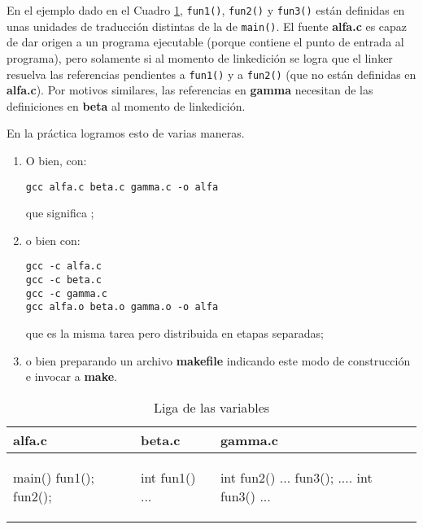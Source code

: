 \begin{ejemplo}
En el ejemplo dado en el Cuadro \ref{tab:ejliga}, \texttt{fun1()}, \texttt{fun2()} y \texttt{fun3()} están definidas en unas unidades de traducción distintas de la de \texttt{main()}. El fuente \textbf{alfa.c} es capaz de dar origen a un programa ejecutable (porque contiene el punto de entrada al programa), pero solamente si al momento de linkedición se logra que el linker resuelva las
referencias pendientes a \texttt{fun1()} y a \texttt{fun2()} (que no están definidas en \textbf{alfa.c}). Por motivos similares,
las referencias en \textbf{gamma} necesitan de las definiciones en \textbf{beta} al momento de linkedición.

En la práctica logramos esto de varias maneras.
\begin{enumerate}
	\item O bien, con:
\begin{lstlisting}
gcc alfa.c beta.c gamma.c -o alfa
\end{lstlisting}

que significa ; 
\item o bien con:

\begin{lstlisting}
gcc -c alfa.c
gcc -c beta.c
gcc -c gamma.c
gcc alfa.o beta.o gamma.o -o alfa
\end{lstlisting}

que es la misma tarea pero distribuida en etapas separadas;
\item o bien preparando un archivo \textbf{makefile} indicando este modo de construcción e invocar a \textbf{make}.
\end{enumerate}


\begin{table}
\centering	
\begin{tabular}{l|l|l}
alfa.c & beta.c & gamma.c \\
\hline
\begin{codecell}
main()
{
	fun1();
	fun2();
}
\end{codecell}
&
\begin{codecell}
int fun1()
{
	...
}
\end{codecell}
&
\begin{codecell}
int fun2()
{
	...
	fun3();
	....
}
int fun3()
{
	...
}
\end{codecell}
\\
\end{tabular}
 \caption{Liga de las variables}
 \label{tab:ejliga} 
\end{table}
\end{ejemplo}


